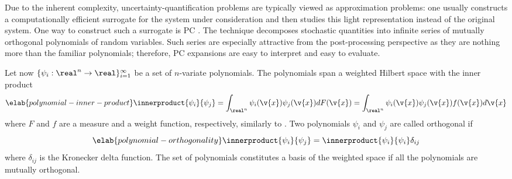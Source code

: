 Due to the inherent complexity, uncertainty-quantification problems are
typically viewed as approximation problems: one usually constructs a
computationally efficient surrogate for the system under consideration and then
studies this light representation instead of the original system. One way to
construct such a surrogate is \acf{PC} \cite{xiu2010}. The technique decomposes
stochastic quantities into infinite series of mutually orthogonal polynomials of
random variables. Such series are especially attractive from the post-processing
perspective as they are nothing more than the familiar polynomials; therefore,
\ac{PC} expansions are easy to interpret and easy to evaluate.

Let now $\{ \psi_i: \real^n \to \real \}_{i = 1}^\infty$ be a set of $n$-variate
polynomials. The polynomials span a weighted Hilbert space with the inner
product
\begin{equation} \elab{polynomial-inner-product}
  \innerproduct{\psi_i}{\psi_j}
  = \int_{\real^n} \psi_i(\v{x}) \psi_j(\v{x}) dF(\v{x})
  = \int_{\real^n} \psi_i(\v{x}) \psi_j(\v{x}) f(\v{x}) d\v{x}
\end{equation}
where $F$ and $f$ are a measure and a weight function, respectively, similarly
to . Two polynomials $\psi_i$ and $\psi_j$ are
called orthogonal if
\begin{equation} \elab{polynomial-orthogonality}
  \innerproduct{\psi_i}{\psi_j} = \innerproduct{\psi_i}{\psi_i} \delta_{ij}
\end{equation}
where $\delta_{ij}$ is the Kronecker delta function. The set of polynomials
constitutes a basis of the weighted space if all the polynomials are mutually
orthogonal.

